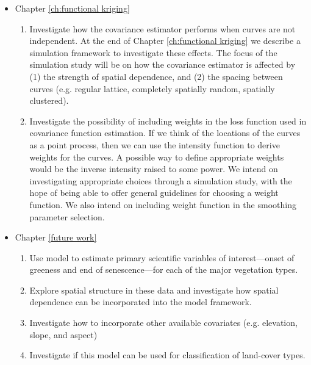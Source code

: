 \begin{itemize}
\item Chapter \ref{ch:functional kriging}
\begin{enumerate}
\item Investigate how the covariance estimator performs when curves are not independent. At the end of Chapter \ref{ch:functional kriging} we describe a simulation framework to investigate these effects. The focus of the simulation study will be on how the covariance estimator is affected by (1) the strength of spatial dependence, and (2) the spacing between curves (e.g. regular lattice, completely spatially random, spatially clustered).
\item Investigate the possibility of including weights in the loss function used in covariance function estimation. If we think of the locations of the curves as a point process, then we can use the intensity function to derive weights for the curves.  A possible way to define appropriate weights would be the inverse intensity raised to some power. We intend on investigating appropriate choices through a simulation study, with the hope of being able to offer general guidelines for  choosing a weight function. We also intend on including weight function in the smoothing parameter selection. 
\end{enumerate}
\item Chapter \ref{future work}
\begin{enumerate}
\item Use model to estimate primary scientific variables of interest---onset of greeness and end of senescence---for each of the major vegetation types.
\item Explore spatial structure in these data and investigate how spatial dependence can be incorporated into the model framework.
\item Investigate how to incorporate other available covariates (e.g. elevation, slope, and aspect)
\item Investigate if this model can be used for classification of land-cover types.
\end{enumerate}
\end{itemize}